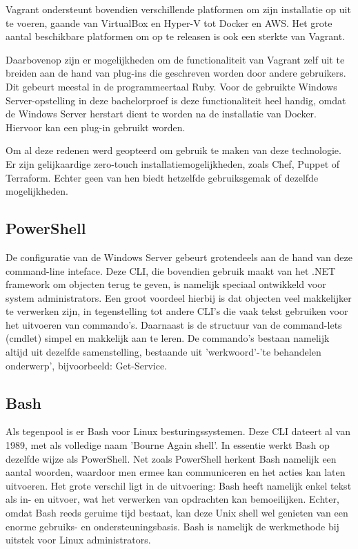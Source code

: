 Vagrant ondersteunt bovendien verschillende platformen om zijn installatie op uit te voeren, gaande van VirtualBox en Hyper-V tot Docker en AWS. Het grote aantal beschikbare platformen om op te releasen is ook een sterkte van Vagrant.

Daarbovenop zijn er mogelijkheden om de functionaliteit van Vagrant zelf uit te breiden aan de hand van plug-ins die geschreven worden door andere gebruikers. Dit gebeurt meestal in de programmeertaal Ruby. Voor de gebruikte Windows Server-opstelling in deze bachelorproef is deze functionaliteit heel handig, omdat de Windows Server herstart dient te worden na de installatie van Docker. Hiervoor kan een plug-in gebruikt worden.

Om al deze redenen werd geopteerd om gebruik te maken van deze technologie. Er zijn gelijkaardige zero-touch installatiemogelijkheden, zoals Chef, Puppet of Terraform. Echter geen van hen biedt hetzelfde gebruiksgemak of dezelfde mogelijkheden.

\subsection{PowerShell}
De configuratie van de Windows Server gebeurt grotendeels aan de hand van deze command-line inteface. Deze CLI, die bovendien gebruik maakt van het .NET framework om objecten terug te geven, is namelijk speciaal ontwikkeld voor system administrators. Een groot voordeel hierbij is dat objecten veel makkelijker te verwerken zijn, in tegenstelling tot andere CLI’s die vaak tekst gebruiken voor het uitvoeren van commando’s. Daarnaast is de structuur van de command-lets (cmdlet) simpel en makkelijk aan te leren. De commando’s bestaan namelijk altijd uit dezelfde samenstelling, bestaande uit 'werkwoord'-'te behandelen onderwerp', bijvoorbeeld: Get-Service.

\subsection{Bash}
Als tegenpool is er Bash voor Linux besturingssystemen. Deze CLI dateert al van 1989, met als volledige naam 'Bourne Again shell'. In essentie werkt Bash op dezelfde wijze als PowerShell. Net zoals PowerShell herkent Bash namelijk een aantal woorden, waardoor men ermee kan communiceren en het acties kan laten uitvoeren. Het grote verschil ligt in de uitvoering: Bash heeft namelijk enkel tekst als in- en uitvoer, wat het verwerken van opdrachten kan bemoeilijken. Echter, omdat Bash reeds geruime tijd bestaat, kan deze Unix shell wel genieten van een enorme gebruiks- en ondersteuningsbasis. Bash is namelijk de werkmethode bij uitstek voor Linux administrators.

